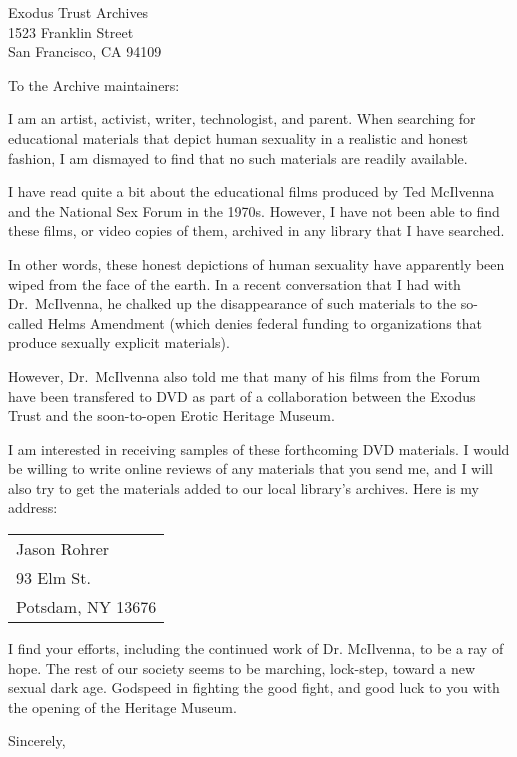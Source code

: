 \documentclass[12pt]{letter}
\begin{document}
\begin{letter}{Exodus Trust Archives\\1523 Franklin Street\\San Francisco, CA 94109}

\address{93 Elm St.\\Potsdam, NY 13676}

\signature{Jason Rohrer}


\opening{To the Archive maintainers:}

I am an artist, activist, writer, technologist, and parent.
When searching for educational materials that depict human sexuality in a realistic and honest fashion, I am dismayed to find that no such materials are readily available.

I have read quite a bit about the educational films produced by Ted McIlvenna and the National Sex Forum in the 1970s.
However, I have not been able to find these films, or video copies of them, archived in any library that I have searched.

In other words, these honest depictions of human sexuality have apparently been wiped from the face of the earth.
In a recent conversation that I had with Dr.\ McIlvenna, he chalked up the disappearance of such materials to the so-called Helms Amendment (which denies federal funding to organizations that produce sexually explicit materials).

However, Dr.\ McIlvenna also told me that many of his films from the Forum have been transfered to DVD as part of a collaboration between the Exodus Trust and the soon-to-open Erotic Heritage Museum.

I am interested in receiving samples of these forthcoming DVD materials.
I would be willing to write online reviews of any materials that you send me,  and I will also try to get the materials added to our local library's archives. 
Here is my address:
\begin{center}
\begin{tabular}{l}
Jason Rohrer\\
93 Elm St.\\
Potsdam, NY 13676 
\end{tabular}
\end{center}

I find your efforts, including the continued work of Dr. McIlvenna, to be a ray of hope.
The rest of our society seems to be marching, lock-step,  toward a new sexual dark age.
Godspeed in fighting the good fight, and good luck to you with the opening of the Heritage Museum.

\closing{Sincerely,}

\end{letter}
\end{document}
